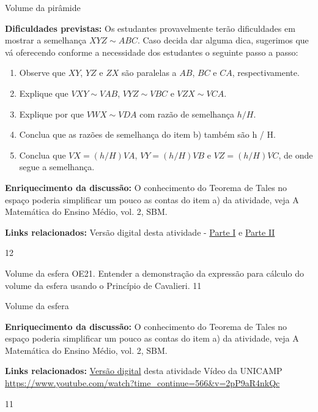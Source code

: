 \begin{sugestions}{Volume da pirâmide}
{
\textbf{Dificuldades previstas:} Os estudantes provavelmente terão dificuldades em mostrar a semelhança \(XYZ \sim ABC\). Caso decida dar alguma dica, sugerimos que vá oferecendo conforme a necessidade dos estudantes o seguinte passo a passo:
\begin{enumerate}
\item {} 
Observe que \(XY\), \(YZ\) e \(ZX\) são paralelas a \(AB\), \(BC\) e \(CA\), respectivamente.

\item {} 
Explique que \(VXY \sim VAB\), \(VYZ \sim VBC\) e \(VZX \sim VCA\).

\item {} 
Explique por que \(VWX \sim VDA\) com razão de semelhança \(h / H\).

\item {} 
Conclua que as razões de semelhança do item b) também são h / H.

\item {} 
Conclua que \(VX = (h/H) VA\), \(VY = (h/H) VB\) e \(VZ = (h/H) VC\), de onde segue a semelhança.

\end{enumerate}

\textbf{Enriquecimento da discussão:} O conhecimento do Teorema de Tales no espaço poderia simplificar um pouco as contas do item a) da atividade, veja A Matemática do Ensino Médio, vol. 2, SBM.

\textbf{Links relacionados:} Versão digital desta atividade - \href{https://ggbm.at/zzcvwr9m}{Parte I} e  \href{https://ggbm.at/sq7h5tjr}{Parte II}
}{1}{2}
\end{sugestions}
\clearmargin
\clearmargin
\clearmargin
\begin{objectives}{Volume da esfera}
{
OE21. Entender a demonstração da expressão para cálculo do volume da esfera usando o Princípio de Cavalieri.
}{1}{1}
\end{objectives}
\begin{sugestions}{Volume da esfera}
{
\textbf{Enriquecimento da discussão:} O conhecimento do Teorema de Tales no espaço poderia simplificar um pouco as contas do item a) da atividade, veja A Matemática do Ensino Médio, vol. 2, SBM.

\textbf{Links relacionados:} \href{https://ggbm.at/dcetmq2g}{Versão digital} desta atividade Vídeo da UNICAMP \url{https://www.youtube.com/watch?time\_continue=566\&v=2pP9aR4nkQc}
}{1}{1}
\end{sugestions}


